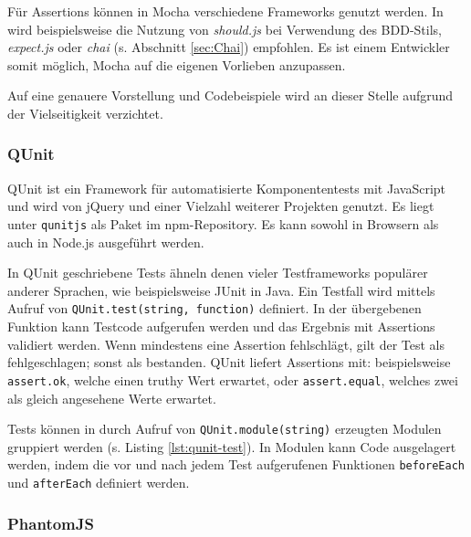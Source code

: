 Für Assertions können in Mocha verschiedene Frameworks genutzt werden. In \cite{mocha-index} wird beispielsweise die Nutzung von \textit{should.js} bei Verwendung des BDD-Stils, \textit{expect.js} oder \textit{chai} (s. Abschnitt \ref{sec:Chai}) empfohlen. Es ist einem Entwickler somit möglich, Mocha auf die eigenen Vorlieben anzupassen.\cite{mocha-index}

Auf eine genauere Vorstellung und Codebeispiele wird an dieser Stelle aufgrund der Vielseitigkeit verzichtet.

\subsubsection{QUnit}
\label{sec:QUnit}
QUnit ist ein Framework für automatisierte Komponententests mit JavaScript und wird von jQuery und einer Vielzahl weiterer Projekten genutzt. Es liegt unter \texttt{qunitjs} als Paket im npm-Repository. Es kann sowohl in Browsern als auch in Node.js ausgeführt werden.\cite{qunit-index}

In QUnit geschriebene Tests ähneln denen vieler Testframeworks populärer anderer Sprachen, wie beispielsweise JUnit in Java. Ein Testfall wird mittels Aufruf von \texttt{QUnit.test(string, function)} definiert. In der übergebenen Funktion kann Testcode aufgerufen werden und das Ergebnis mit Assertions validiert werden. Wenn mindestens eine Assertion fehlschlägt, gilt der Test als fehlgeschlagen; sonst als bestanden. QUnit liefert Assertions mit: beispielsweise \texttt{assert.ok}, welche einen truthy Wert erwartet, oder \texttt{assert.equal}, welches zwei als gleich angesehene Werte erwartet.\cite{qunit-cookbook}

Tests können in durch Aufruf von \texttt{QUnit.module(string)} erzeugten Modulen gruppiert werden (s. Listing \ref{lst:qunit-test}). In Modulen kann Code ausgelagert werden, indem die vor und nach jedem Test aufgerufenen Funktionen \texttt{beforeEach} und \texttt{afterEach} definiert werden.\cite{qunit-cookbook}

\begin{figure}[H]
	
\end{figure}
\subsubsection{PhantomJS}
\label{sec:PhantomJS}

